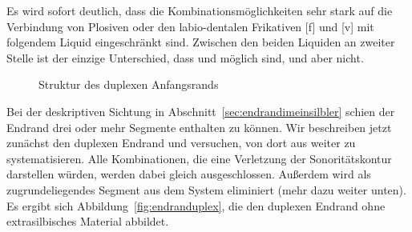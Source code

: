 Es wird sofort deutlich, dass die Kombinationsmöglichkeiten sehr stark auf die Verbindung von Plosiven oder den labio-dentalen Frikativen [f] und [v] mit folgendem Liquid eingeschränkt sind.
Zwischen den beiden Liquiden an zweiter Stelle ist der einzige Unterschied, dass \textipa{[pK]} und \textipa{[vK]} möglich sind, \textipa{[pl]} und \textipa{[vl]} aber nicht.


\begin{figure}[!htbp]
  \centering
  \caption{Struktur des duplexen Anfangsrands}
  \label{fig:anfangsrandduplex}
\end{figure}

Bei der deskriptiven Sichtung in Abschnitt~\ref{sec:endrandimeinsilbler} schien der Endrand drei oder mehr Segmente enthalten zu können.
Wir beschreiben jetzt zunächst den duplexen Endrand und versuchen, von dort aus weiter zu systematisieren.
Alle Kombinationen, die eine Verletzung der Sonoritätskontur darstellen würden, werden dabei gleich ausgeschlossen.
Außerdem wird \textipa{[N]} als zugrundeliegendes Segment aus dem System eliminiert (mehr dazu weiter unten).
Es ergibt sich Abbildung~\ref{fig:endranduplex}, die den duplexen Endrand ohne extrasilbisches Material abbildet.

